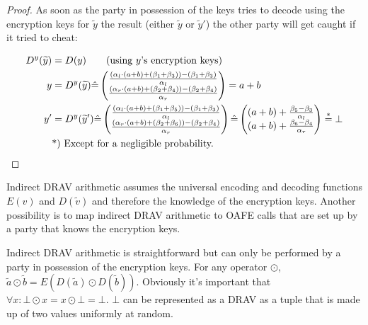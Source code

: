 \begin{proof}
  As soon as the party in possession of the keys tries to decode using the
  encryption keys for $\widetilde{y}$ the result (either $\widetilde{y}$ or
  $\widetilde{y}'$) the other party will get caught if it tried to cheat:

  \begin{align*}
    D^y(\widetilde{y}) &= D(y) \qquad\text{(using $y$'s encryption keys)}\\
    y &= D^y(\widetilde{y}) \hat{=}
    \begin{pmatrix}
      \frac{(\alpha_l \cdot (a+b) + (\beta_1 + \beta_3)) - (\beta_1+\beta_3)}
           {\alpha_l}\\
      \frac{(\alpha_r \cdot (a+b) + (\beta_2 + \beta_4)) - (\beta_2+\beta_4)}
           {\alpha_r}\\
    \end{pmatrix}
    = a+b\\
    y' &= D^y(\widetilde{y}')
    \hat{=}
    \begin{pmatrix}
      \frac{(\alpha_l \cdot (a+b) + (\beta_1 + \beta_5)) - (\beta_1+\beta_3)}
           {\alpha_l}\\
      \frac{(\alpha_r \cdot (a+b) + (\beta_2 + \beta_6)) - (\beta_2+\beta_4)}
           {\alpha_r}\\
    \end{pmatrix}
    \hat{=}
    \begin{pmatrix}
      (a+b) +
      \frac{\beta_5 - \beta_3}{\alpha_l}\\
      (a+b) +
      \frac{\beta_6 - \beta_4}{\alpha_r}\\
    \end{pmatrix}
    \stackrel{*}{=} \bot\\
    &\text{*) Except for a negligible probability.}{}
  \end{align*}
\end{proof}


\label{sec:indirect-DRAV-arithmetic}

Indirect DRAV arithmetic assumes the universal encoding and decoding functions
$E(v)$ and $D(\widetilde{v})$ and therefore the knowledge of the encryption
keys. Another possibility is to map indirect DRAV arithmetic to OAFE calls that
are set up by a party that knows the encryption keys.

Indirect DRAV arithmetic is straightforward but can only be performed by a party
in possession of the encryption keys. For any operator $\odot$, $\widetilde{a}
\odot \widetilde{b} = E(D(\widetilde{a}) \odot D(\widetilde{b}))$. Obviously
it's important that $\forall x: \bot \odot x = x \odot \bot = \bot$. $\bot$ can
be represented as a DRAV as a tuple that is made up of two values uniformly at
random.


